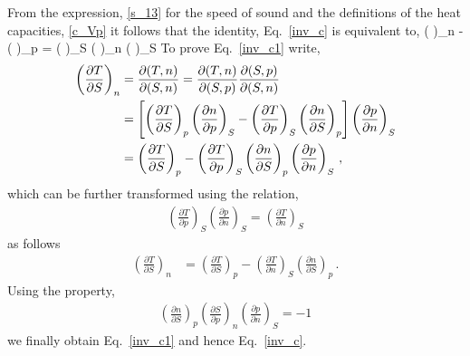  From the expression, \eqref{s_13} for the speed of sound and the definitions of the heat capacities, \eqref{c_Vp} it follows that the identity, Eq.~\eqref{inv_c} is equivalent to,
\be\label{inv_c1}
\left( \right)_n - \left( \right)_p =
\left( \right)_S \left( \right)_n \left( \right)_S 
\ee
To prove Eq.~\eqref{inv_c1} write,
\begin{align}\label{inv_c2}
\left( \frac{ \partial  T}{\partial S }\right)_n & = \frac{ \partial (T,n)}{\partial (S,n)} = 
\frac{ \partial (T,n)}{\partial (S,p)} \frac{ \partial (S,p)}{\partial (S,n)}
\notag \\
&=
\left[
\left( \frac{ \partial  T}{\partial S }\right)_p \left( \frac{ \partial  n}{\partial p}\right)_S 
-
\left( \frac{ \partial  T}{\partial p }\right)_S \left( \frac{ \partial  n}{\partial S }\right)_p 
\right] \left( \frac{ \partial  p}{\partial n }\right)_S
\notag \\
&=
\left( \frac{ \partial  T}{\partial S }\right)_p 
-
\left( \frac{ \partial  T}{\partial p }\right)_S \left( \frac{ \partial  n}{\partial S }\right)_p 
 \left( \frac{ \partial  p}{\partial n }\right)_S\, ,
\end{align}
which can be further transformed using the relation,
\begin{align}
\left( \frac{ \partial  T}{\partial p }\right)_S  \left( \frac{ \partial  p}{\partial n }\right)_S = 
\left( \frac{ \partial  T}{\partial n }\right)_S
\end{align}
as follows
\begin{align}
\left( \frac{ \partial  T}{\partial S }\right)_n & = \left( \frac{ \partial  T}{\partial S }\right)_p 
-
\left( \frac{ \partial  T}{\partial n }\right)_S \left( \frac{ \partial  n}{\partial S }\right)_p 
 \, .
\end{align}
Using the property,
\begin{align}
\left( \frac{ \partial  n}{\partial S }\right)_p \left( \frac{ \partial  S}{\partial p }\right)_n \left( \frac{ \partial  p}{\partial n }\right)_S = -1
\end{align}
we finally obtain Eq.~\eqref{inv_c1} and hence Eq.~\eqref{inv_c}.

